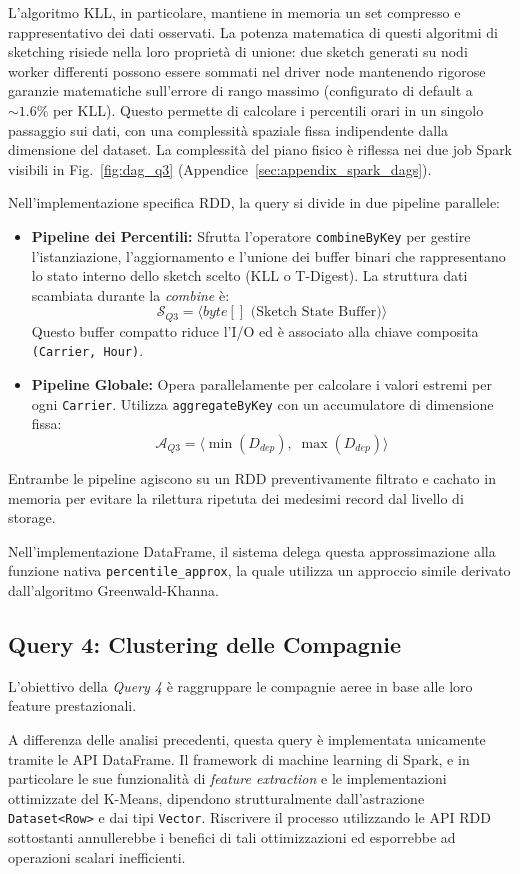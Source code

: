 \documentclass[conference]{IEEEtran}
\begin{document}
L'algoritmo KLL, in particolare, mantiene in memoria un set compresso e rappresentativo dei dati osservati.
La potenza matematica di questi algoritmi di sketching risiede nella loro proprietà di unione: due sketch generati su nodi worker differenti possono essere sommati nel driver node mantenendo rigorose garanzie matematiche sull'errore di rango massimo (configurato di default a $\sim 1.6\%$ per KLL).
Questo permette di calcolare i percentili orari in un singolo passaggio sui dati, con una complessità spaziale fissa indipendente dalla dimensione del dataset. La complessità del piano fisico è riflessa nei due job Spark visibili in Fig.~\ref{fig:dag_q3} (Appendice~\ref{sec:appendix_spark_dags}).

Nell'implementazione specifica RDD, la query si divide in due pipeline parallele:
\begin{itemize}
    \item \textbf{Pipeline dei Percentili:} Sfrutta l'operatore \texttt{combineByKey} per gestire l'istanziazione, l'aggiornamento e l'unione dei buffer binari che rappresentano lo stato interno dello sketch scelto (KLL o T-Digest). La struttura dati scambiata durante la \textit{combine} è:
    \[
    \mathcal{S}_{Q3} = \langle byte[] \text{ (Sketch State Buffer)} \rangle
    \]
    Questo buffer compatto riduce l'I/O ed è associato alla chiave composita \texttt{(Carrier, Hour)}.
    \item \textbf{Pipeline Globale:} Opera parallelamente per calcolare i valori estremi per ogni \texttt{Carrier}. Utilizza \texttt{aggregateByKey} con un accumulatore di dimensione fissa:
    \[
    \mathcal{A}_{Q3} = \langle \min(D_{dep}),\; \max(D_{dep}) \rangle
    \]
\end{itemize}
Entrambe le pipeline agiscono su un RDD preventivamente filtrato e cachato in memoria per evitare la rilettura ripetuta dei medesimi record dal livello di storage.

Nell'implementazione DataFrame, il sistema delega questa approssimazione alla funzione nativa \texttt{percentile\_approx}, la quale utilizza un approccio simile derivato dall'algoritmo Greenwald-Khanna.

\subsection{Query 4: Clustering delle Compagnie}
L'obiettivo della \textit{Query 4} è raggruppare le compagnie aeree in base alle loro feature prestazionali.

A differenza delle analisi precedenti, questa query è implementata unicamente tramite le API DataFrame.
Il framework di machine learning di Spark, e in particolare le sue funzionalità di \textit{feature extraction} e le implementazioni ottimizzate del K-Means, dipendono strutturalmente dall'astrazione \texttt{Dataset<Row>} e dai tipi \texttt{Vector}.
Riscrivere il processo utilizzando le API RDD sottostanti annullerebbe i benefici di tali ottimizzazioni ed esporrebbe ad operazioni scalari inefficienti.
\end{document}
